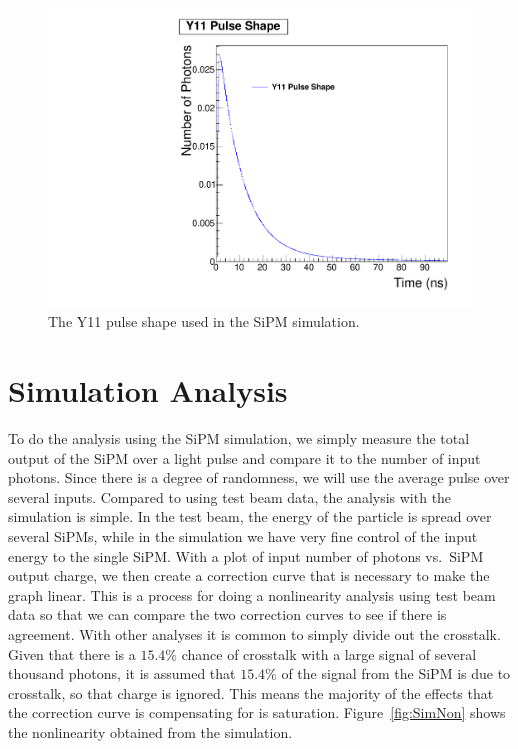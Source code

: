 \begin{figure}
\centering
\includegraphics[width=0.8\linewidth]{Figures/Y11.pdf}
\caption{The Y11 pulse shape used in the SiPM simulation.}
\label{fig:Y11}
\end{figure}

\section{Simulation Analysis}

To do the analysis using the SiPM simulation, we simply measure the total output of the SiPM over a light pulse and compare it to the number of input photons. Since there is a degree of randomness, we will use the average pulse over several inputs. Compared to using test beam data, the analysis with the simulation is simple. In the test beam, the energy of the particle is spread over several SiPMs, while in the simulation we have very fine control of the input energy to the single SiPM. With a plot of input number of photons vs.\ SiPM output charge, we then create a correction curve that is necessary to make the graph linear. This is a process for doing a nonlinearity analysis using test beam data so that we can compare the two correction curves to see if there is agreement. With other analyses it is common to simply divide out the crosstalk. Given that there is a $15.4\%$ chance of crosstalk with a large signal of several thousand photons, it is assumed that $15.4\%$ of the signal from the SiPM is due to crosstalk, so that charge is ignored. This means the majority of the effects that the correction curve is compensating for is saturation. Figure~\ref{fig:SimNon} shows the nonlinearity obtained from the simulation.

